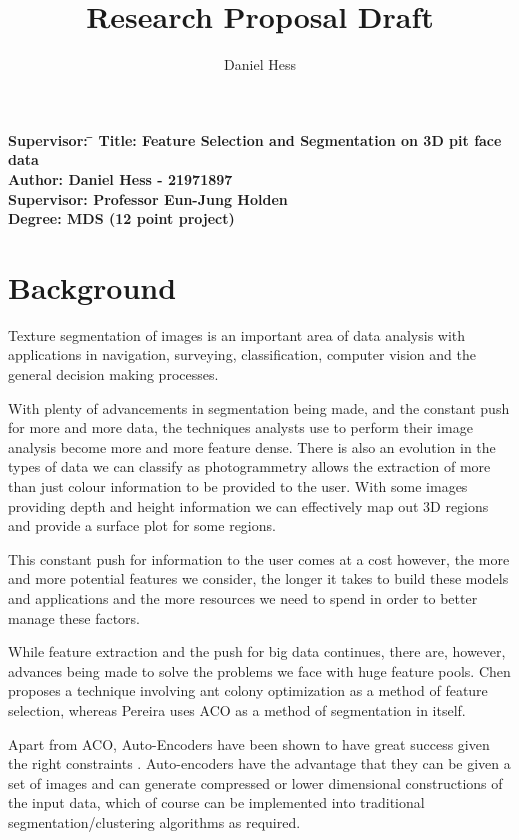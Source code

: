 \documentclass[12pt, a4paper]{article}
\title{Research Proposal Draft}
\author{Daniel Hess}
\date{}
\begin{document}
\maketitle

\begin{tabbing}
\bf Supervisor: \=\kill
\bf Title:   \> Feature Selection and Segmentation on 3D pit face data \\
\bf Author:  \> Daniel Hess - 21971897 \\
\bf Supervisor:   \> Professor Eun-Jung Holden \\
\bf Degree:   \> MDS (12 point project)
\end{tabbing}

\section*{Background}

Texture segmentation of images is an important area of data analysis with applications in navigation, surveying, classification, computer vision and the general decision making processes. 

With plenty of advancements in segmentation being made, and the constant push for more and more data, the techniques analysts use to perform their image analysis become more and more feature dense. There is also an evolution in the types of data we can classify as photogrammetry allows the extraction of more than just colour information to be provided to the user. With some images providing depth and height information we can effectively map out 3D regions and provide a surface plot for some regions.

This constant push for information to the user comes at a cost however, the more and more potential features we consider, the longer it takes to build these models and applications and the more resources we need to spend in order to better manage these factors.

While feature extraction and the push for big data continues, there are, however, advances being made to solve the problems we face with huge feature pools. Chen \cite{chen2013efficient} proposes a technique involving ant colony optimization as a method of feature selection, whereas Pereira \cite{pereira2015exudate} uses ACO as a method of segmentation in itself. 

Apart from ACO, Auto-Encoders have been shown to have great success given the right constraints \cite{wang2017feature}. Auto-encoders have the advantage that they can be given a set of images and can generate compressed or lower dimensional constructions of the input data, which of course can be implemented into traditional segmentation/clustering algorithms as required.
\end{document}
